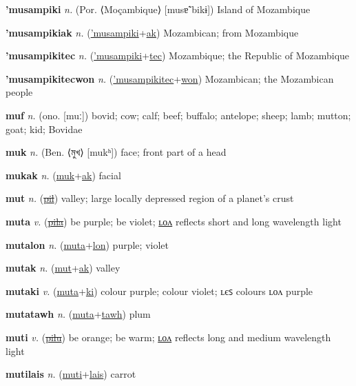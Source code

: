 \textbf{\hypertarget{'musampiki}{'musampiki}} \textit{n.} (Por. ⟨Moçambique⟩ [musɐ̃ˈbikɨ])
Island of Mozambique

\textbf{\hypertarget{'musampikiak}{'musampikiak}} \textit{n.} (\hyperlink{'musampiki}{'musampiki}+\allowbreak \hyperlink{ak}{ak})
Mozambican; from Mozambique

\textbf{\hypertarget{'musampikitec}{'musampikitec}} \textit{n.} (\hyperlink{'musampiki}{'musampiki}+\allowbreak \hyperlink{tec}{tec})
Mozambique; the Republic of Mozambique

\textbf{\hypertarget{'musampikitecwon}{'musampikitecwon}} \textit{n.} (\hyperlink{'musampikitec}{'musampikitec}+\allowbreak \hyperlink{won}{won})
Mozambican; the Mozambican people

\textbf{\hypertarget{muf}{muf}} \textit{n.} (ono. [muː])
bovid; cow; calf; beef; buffalo; antelope; sheep; lamb; mutton; goat; kid; Bovidae

\textbf{\hypertarget{muk}{muk}} \textit{n.} (Ben. ⟨{\bengali{}মুখ}⟩ [mukʰ])
face; front part of a head

\textbf{\hypertarget{mukak}{mukak}} \textit{n.} (\hyperlink{muk}{muk}+\allowbreak \hyperlink{ak}{ak})
facial

\textbf{\hypertarget{mut}{mut}} \textit{n.} (\hyperlink{pil}{\sout{pil}})
valley; large locally depressed region of a planet’s crust

\textbf{\hypertarget{muta}{muta}} \textit{v.} (\hyperlink{pila}{\sout{pila}})
be purple; be violet; \hyperlink{mutalon}{ʟᴏᴧ} reflects short and long wavelength light

\textbf{\hypertarget{mutalon}{mutalon}} \textit{n.} (\hyperlink{muta}{muta}+\allowbreak \hyperlink{lon}{lon})
purple; violet

\textbf{\hypertarget{mutak}{mutak}} \textit{n.} (\hyperlink{mut}{mut}+\allowbreak \hyperlink{ak}{ak})
valley

\textbf{\hypertarget{mutaki}{mutaki}} \textit{v.} (\hyperlink{muta}{muta}+\allowbreak \hyperlink{ki}{ki})
colour purple; colour violet; ʟєꜱ colours ʟᴏᴧ purple

\textbf{\hypertarget{mutatawh}{mutatawh}} \textit{n.} (\hyperlink{muta}{muta}+\allowbreak \hyperlink{tawh}{tawh})
plum

\textbf{\hypertarget{muti}{muti}} \textit{v.} (\hyperlink{pilu}{\sout{pilu}})
be orange; be warm; \hyperlink{mutilon}{ʟᴏᴧ} reflects long and medium wavelength light

\textbf{\hypertarget{mutilais}{mutilais}} \textit{n.} (\hyperlink{muti}{muti}+\allowbreak \hyperlink{lais}{lais})
carrot


